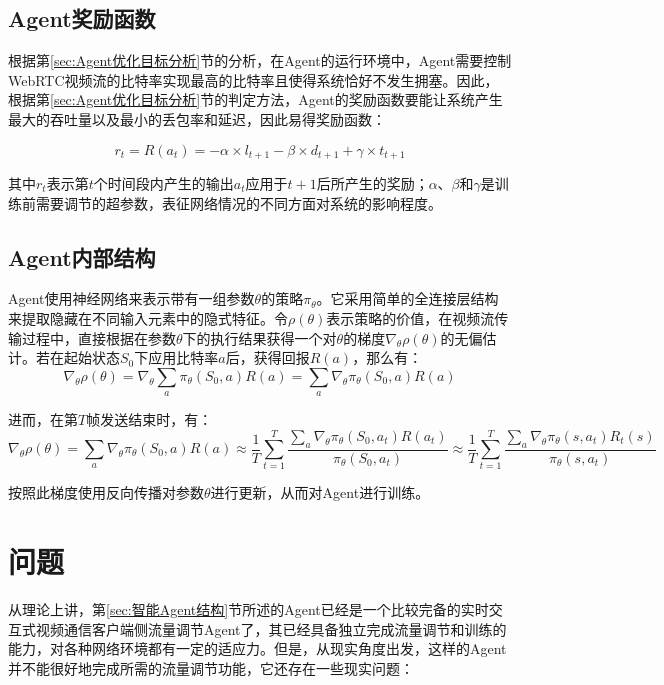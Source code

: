 \documentclass[a4paper]{ctexart}
\begin{document}
\subsection{Agent奖励函数}

根据第\ref{sec:Agent优化目标分析}节的分析，在Agent的运行环境中，Agent需要控制WebRTC视频流的比特率实现最高的比特率且使得系统恰好不发生拥塞。因此，根据第\ref{sec:Agent优化目标分析}节的判定方法，Agent的奖励函数要能让系统产生最大的吞吐量以及最小的丢包率和延迟，因此易得奖励函数：

$$r_t=R(a_t)=-\alpha\times l_{t+1}-\beta\times d_{t+1}+\gamma\times t_{t+1}$$

其中$r_t$表示第$t$个时间段内产生的输出$a_t$应用于$t+1$后所产生的奖励；$\alpha$、$\beta$和$\gamma$是训练前需要调节的超参数，表征网络情况的不同方面对系统的影响程度。

\subsection{Agent内部结构}

Agent使用神经网络来表示带有一组参数$\theta$的策略$\pi_\theta$。它采用简单的全连接层结构来提取隐藏在不同输入元素中的隐式特征。令$\rho(\theta)$表示策略的价值，在视频流传输过程中，直接根据在参数$\theta$下的执行结果获得一个对$\theta$的梯度$\nabla_\theta\rho(\theta)$的无偏估计。若在起始状态$S_0$下应用比特率$a$后，获得回报$R(a)$，那么有：
$$\nabla_\theta\rho(\theta)=\nabla_\theta\sum_a\pi_\theta(S_0,a)R(a)=\sum_a\nabla_\theta\pi_\theta(S_0,a)R(a)$$

进而，在第$T$帧发送结束时，有：
$$\nabla_\theta\rho(\theta)=\sum_a\nabla_\theta\pi_\theta(S_0,a)R(a)\approx\frac{1}{T}\sum_{t=1}^T\frac{\sum_a\nabla_\theta\pi_\theta(S_0,a_t)R(a_t)}{\pi_\theta(S_0,a_t)}\approx\frac{1}{T}\sum_{t=1}^T\frac{\sum_a\nabla_\theta\pi_\theta(s,a_t)R_t(s)}{\pi_\theta(s,a_t)}$$

按照此梯度使用反向传播对参数$\theta$进行更新，从而对Agent进行训练。

\section{问题}\label{sec:问题}

从理论上讲，第\ref{sec:智能Agent结构}节所述的Agent已经是一个比较完备的实时交互式视频通信客户端侧流量调节Agent了，其已经具备独立完成流量调节和训练的能力，对各种网络环境都有一定的适应力。但是，从现实角度出发，这样的Agent并不能很好地完成所需的流量调节功能，它还存在一些现实问题：
\end{document}
